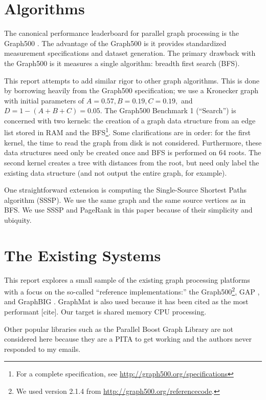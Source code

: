 \documentclass[conference]{IEEEtran}
\begin{document}
\section{Algorithms}
The canonical performance leaderboard for parallel graph processing is the Graph500 \cite{Murphy:2010:Graph500}. The advantage of the Graph500 is it provides standardized measurement specifications and dataset generation. The primary drawback with the Graph500 is it measures a single algorithm: breadth first search (BFS).

This report attempts to add similar rigor to other graph algorithms. This is done by borrowing heavily from the Graph500 specification; we use a Kronecker graph \cite{Leskovec:2010:Kronecker} with initial parameters of $A = 0.57, B = 0.19,
C = 0.19,$ and $D = 1-(A+B+C) = 0.05$. The Graph500 Benchmark 1 (``Search'') is concerned with two kernels: the creation of a graph data structure from an edge list stored in RAM and the BFS\footnote{For a complete specification, see \url{http://graph500.org/specifications}}. Some clarifications are in order: for the first kernel, the time to read the graph from disk is not considered. Furthermore, these data structures need only be created once and BFS is performed on 64 roots. The second kernel creates a tree with distances from the root, but need only label the existing data structure (and not output the entire graph, for example).

One straightforward extension is computing the Single-Source Shortest Paths algorithm (SSSP). We use the same graph and the same source vertices as in BFS. We use SSSP and PageRank in this paper because of their simplicity and ubiquity.

\section{The Existing Systems}
This report explores a small sample of the existing graph processing platforms with a focus on the so-called ``reference implementations:'' the Graph500\footnote{We used version 2.1.4 from \url{http://graph500.org/referencecode}.}, GAP \cite{Beamer:2015:GAPBench}, and GraphBIG \cite{Nai:2015:Graphbig}. GraphMat is also used because it has been cited as the most performant [cite]. Our target is shared memory CPU processing.

Other popular libraries such as the Parallel Boost Graph Library \cite{Gregor:2005:PBGL} %
are not considered here because they are a PITA to get working and the authors never responded to my emails.
\end{document}
